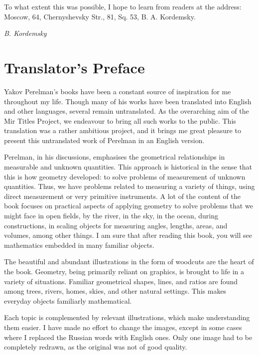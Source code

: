 To what extent this was possible, I hope to learn from readers at the address: Moscow, 64, Chernyshevsky Str., 81, Sq. 53, B. A. Kordemsky.


\begin{flushright}
\emph{B. Kordemsky}
\end{flushright}


\chapter{Translator's Preface}
\label{translator-preface}


Yakov Perelman's books have been a constant source of inspiration for me throughout my life. Though many of his works have been translated into English and other languages, several remain untranslated. As the overarching aim of the Mir Titles Project, we endeavour to bring all such works to the public. This translation was a rather ambitious project, and it brings me great pleasure to present this untranslated work of Perelman in an English version.


Perelman, in his discussions, emphasises the geometrical relationships in measurable and unknown quantities. This approach is historical in the sense that this is how geometry developed: to solve problems of measurement of unknown quantities. Thus, we have problems related to measuring a variety of things, using direct measurement or very primitive instruments. A lot of the content of the book focuses on practical aspects of applying geometry to solve problems that we might face in open fields, by the river, in the sky, in the ocean, during constructions, in scaling objects for measuring angles, lengths, areas, and volumes, among other things. I am sure that after reading this book, you will see mathematics embedded in many familiar objects.


The beautiful and abundant illustrations in the form of woodcuts are the heart of the book. Geometry, being primarily reliant on graphics, is brought to life in a variety of situations. Familiar geometrical shapes, lines, and ratios are found among trees, rivers, homes, skies, and other natural settings. This makes everyday objects familiarly mathematical.

Each topic is complemented by relevant illustrations, which make understanding them easier. I have made no effort to change the images, except in some cases where I replaced the Russian words with English ones. Only one image had to be completely redrawn, as the original was not of good quality.

